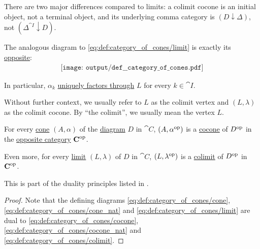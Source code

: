 \begin{definition}
\begin{thmenum}
    There are two major differences compared to limits: a colimit cocone is an initial object, not a terminal object, and its underlying comma category is \( (D \downarrow \Delta) \), not \( (\Delta^{\cat{I}} \downarrow D) \).

    The analogous diagram to \eqref{eq:def:category_of_cones/limit} is exactly its \hyperref[thm:categorical_principle_of_duality]{opposite}:
    \begin{equation}\label{eq:def:category_of_cones/colimit}
      \begin{aligned}
        \texttt{[image: output/def\_\_category\_of\_cones.pdf]}
      \end{aligned}
    \end{equation}

    In particular, \( \alpha_k \) \hyperref[def:factors_through]{uniquely factors through} \( L \) for every \( k \in \cat{I} \).

    Without further context, we usually refer to \( L \) as the colimit vertex and \( (L, \lambda) \) as the colimit cocone. By \enquote{the colimit}, we usually mean the vertex \( L \).
  \end{thmenum}
\end{definition}

\begin{proposition}\label{thm:categorical_limit_duality}
  For every \hyperref[def:category_of_cones/cone]{cone} \( (A, \alpha) \) of the \hyperref[def:categorical_diagram]{diagram} \( D \) in \( \cat{C} \), \( (A, \alpha^{\operatorname{op}}) \) is a \hyperref[def:category_of_cones/cone]{cocone} of \( D^{\operatorname{op}} \) in the \hyperref[def:opposite_category]{opposite category} \( \operatorname{\mathbf{C}}^{\operatorname{op}} \).

  Even more, for every \hyperref[def:category_of_cones/limit]{limit} \( (L, \lambda) \) of \( D \) in \( \cat{C} \), \( (L, \lambda^{\operatorname{op}}) \) is a \hyperref[def:category_of_cones/colimit]{colimit} of \( D^{\operatorname{op}} \) in \( \operatorname{\mathbf{C}}^{\operatorname{op}} \).

  This is part of the duality principles listed in .
\end{proposition}
\begin{proof}
  Note that the defining diagrams \eqref{eq:def:category_of_cones/cone}, \eqref{eq:def:category_of_cones/cone_nat} and \eqref{eq:def:category_of_cones/limit} are dual to \eqref{eq:def:category_of_cones/cocone}, \eqref{eq:def:category_of_cones/cocone_nat} and \eqref{eq:def:category_of_cones/colimit}.
\end{proof}

